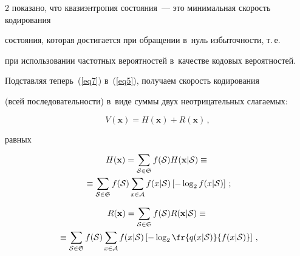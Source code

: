 \begin{multicols}{2}
показано, что квазиэнтропия состояния~--- это минималь\-ная скорость кодирования 

со\-сто\-яния, которая достигается при обращении в~нуль из\-бы\-точ\-ности, т.\,е.\ 

при использовании частотных вероятностей в~качестве кодовых вероятностей. 

Подставляя теперь~(\ref{eq7}) в~(\ref{eq5}), получаем скорость кодирования 

(всей последовательности) в~виде суммы двух не\-от\-ри\-ца\-тель\-ных слагаемых:

\begin{equation}

\label{eq11}

V(\mathbf{x}) = H(\mathbf{x}) + R(\mathbf{x})\,,

\end{equation}

равных

\begin{multline}

\label{eq12}

H(\mathbf{x}) = \sum\limits_{{\cal S}\in{\frak S}} f({\cal S}) 

H(\mathbf{x}|{\cal S}) \equiv{}\\

{}\equiv

\sum\limits_{{\cal S}\in{\frak S}} f({\cal S}) 

\sum\limits_{x\in{\cal A}} f(x|{\cal S}) \left[-\log_{2}f(x|{\cal S})\right]\,;

\end{multline}



\vspace*{-12pt}



\noindent

\begin{multline}

\label{eq13}

R(\mathbf{x}) =\sum\limits_{{\cal S}\in{\frak S}} f({\cal S}) 

R(\mathbf{x}|{\cal S}) \equiv{}\\

{}\equiv

\sum\limits_{{\cal S}\in{\frak S}} f({\cal S})

\sum\limits_{x\in{\cal A}} f(x|{\cal S})\left[

-\log_{2}\fr{q(x|{\cal S})}{f(x|{\cal S})}\right]\,,


\end{multline}
\end{multicols}
